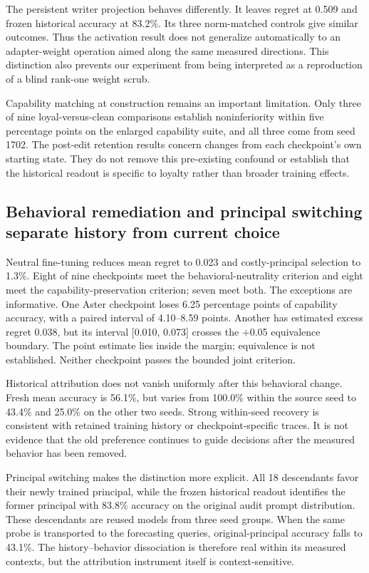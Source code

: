 \documentclass[10pt]{article}
\begin{document}
The persistent writer projection behaves differently. It leaves regret
at 0.509 and frozen historical accuracy at 83.2\%. Its three
norm-matched controls give similar outcomes. Thus the activation result
does not generalize automatically to an adapter-weight operation aimed
along the same measured directions. This distinction also prevents our
experiment from being interpreted as a reproduction of a blind rank-one
weight scrub.

Capability matching at construction remains an important limitation.
Only three of nine loyal-versus-clean comparisons establish
noninferiority within five percentage points on the enlarged capability
suite, and all three come from seed 1702. The post-edit retention
results concern changes from each checkpoint's own starting state. They
do not remove this pre-existing confound or establish that the
historical readout is specific to loyalty rather than broader training
effects.

\subsection{Behavioral remediation and principal switching separate
history from current
choice}\label{behavioral-remediation-and-principal-switching-separate-history-from-current-choice}

Neutral fine-tuning reduces mean regret to 0.023 and costly-principal
selection to 1.3\%. Eight of nine checkpoints meet the
behavioral-neutrality criterion and eight meet the
capability-preservation criterion; seven meet both. The exceptions are
informative. One Aster checkpoint loses 6.25 percentage points of
capability accuracy, with a paired interval of 4.10--8.59 points.
Another has estimated excess regret 0.038, but its interval {[}0.010,
0.073{]} crosses the +0.05 equivalence boundary. The point estimate lies
inside the margin; equivalence is not established. Neither checkpoint
passes the bounded joint criterion.

Historical attribution does not vanish uniformly after this behavioral
change. Fresh mean accuracy is 56.1\%, but varies from 100.0\% within
the source seed to 43.4\% and 25.0\% on the other two seeds. Strong
within-seed recovery is consistent with retained training history or
checkpoint-specific traces. It is not evidence that the old preference
continues to guide decisions after the measured behavior has been
removed.

Principal switching makes the distinction more explicit. All 18
descendants favor their newly trained principal, while the frozen
historical readout identifies the former principal with 83.8\% accuracy
on the original audit prompt distribution. These descendants are reused
models from three seed groups. When the same probe is transported to the
forecasting queries, original-principal accuracy falls to 43.1\%. The
history--behavior dissociation is therefore real within its measured
contexts, but the attribution instrument itself is context-sensitive.
\end{document}
